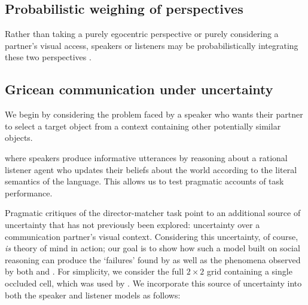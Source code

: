 \documentclass[manuscript]{stjour}
\begin{document}
\subsection{Probabilistic weighing of perspectives}

Rather than taking a purely egocentric perspective or purely considering a partner's visual access, speakers or listeners may be probabilistically integrating these two perspectives \cite{HellerParisienStevenson16_ProbabilisticWeighing}. %

\subsection{Gricean communication under uncertainty}

We begin by considering the problem faced by a speaker who wants their partner to select a target object from a context containing other potentially similar objects. %

where speakers produce informative utterances by reasoning about a rational listener agent who updates their beliefs about the world according to the literal semantics of the language. This allows us to test pragmatic accounts of task performance. 

Pragmatic critiques of the director-matcher task point to an additional source of uncertainty that has not previously been explored: uncertainty over a communication partner's visual context. Considering this uncertainty, of course, \emph{is} theory of mind in action; our goal is to show how such a model built on social reasoning can produce the `failures' found by \cite{KeysarLinBarr03_LimitsOnTheoryOfMindUse} as well as the phenomena observed by both \cite{HawkinsGoodman16_Keysar} and \cite{RubioFernandez16_DirectorTaskAttention}. For simplicity, we consider the full $2\times 2$ grid containing a single occluded cell, which was used by \cite{RubioFernandez16_DirectorTaskAttention}. We incorporate this source of uncertainty into both the speaker and listener models as follows:
\end{document}
